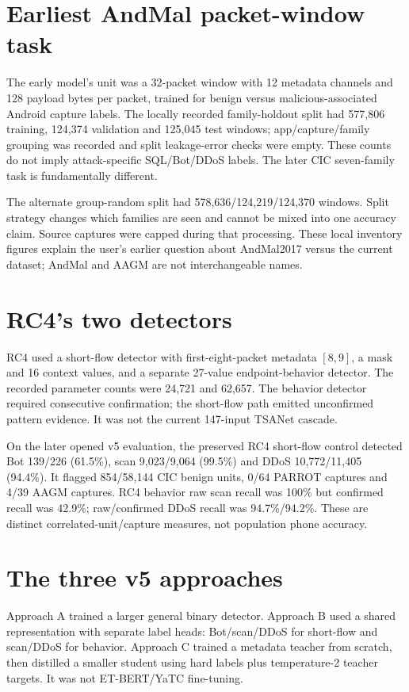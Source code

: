 \documentclass[11pt,a4paper,oneside]{report}
\begin{document}
\section{Earliest AndMal packet-window task}
The early model's unit was a 32-packet window with 12 metadata channels and 128 payload bytes per packet, trained for benign versus malicious-associated Android capture labels. The locally recorded family-holdout split had 577,806 training, 124,374 validation and 125,045 test windows; app/capture/family grouping was recorded and split leakage-error checks were empty. These counts do not imply attack-specific SQL/Bot/DDoS labels. The later CIC seven-family task is fundamentally different.

The alternate group-random split had 578,636/124,219/124,370 windows. Split strategy changes which families are seen and cannot be mixed into one accuracy claim. Source captures were capped during that processing. These local inventory figures explain the user's earlier question about AndMal2017 versus the current dataset; AndMal and AAGM are not interchangeable names.

\section{RC4's two detectors}
RC4 used a short-flow detector with first-eight-packet metadata $[8,9]$, a mask and 16 context values, and a separate 27-value endpoint-behavior detector. The recorded parameter counts were 24,721 and 62,657. The behavior detector required consecutive confirmation; the short-flow path emitted unconfirmed pattern evidence. It was not the current 147-input TSANet cascade.

On the later opened v5 evaluation, the preserved RC4 short-flow control detected Bot 139/226 (61.5\%), scan 9,023/9,064 (99.5\%) and DDoS 10,772/11,405 (94.4\%). It flagged 854/58,144 CIC benign units, 0/64 PARROT captures and 4/39 AAGM captures. RC4 behavior raw scan recall was 100\% but confirmed recall was 42.9\%; raw/confirmed DDoS recall was 94.7\%/94.2\%. These are distinct correlated-unit/capture measures, not population phone accuracy.

\section{The three v5 approaches}
Approach A trained a larger general binary detector. Approach B used a shared representation with separate label heads: Bot/scan/DDoS for short-flow and scan/DDoS for behavior. Approach C trained a metadata teacher from scratch, then distilled a smaller student using hard labels plus temperature-2 teacher targets. It was not ET-BERT/YaTC fine-tuning.
\end{document}
